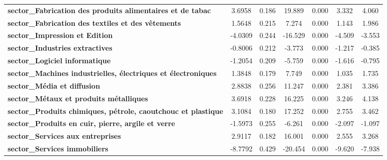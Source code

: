 \begin{center}
\begin{tabular}{lcccccc}
\textbf{sector\_Fabrication des produits alimentaires et de tabac}    &       3.6958  &        0.186     &    19.889  &         0.000        &        3.332    &        4.060     \\
\textbf{sector\_Fabrication des textiles et des vêtements}            &       1.5648  &        0.215     &     7.274  &         0.000        &        1.143    &        1.986     \\
\textbf{sector\_Impression et Edition}                                &      -4.0309  &        0.244     &   -16.529  &         0.000        &       -4.509    &       -3.553     \\
\textbf{sector\_Industries extractives}                               &      -0.8006  &        0.212     &    -3.773  &         0.000        &       -1.217    &       -0.385     \\
\textbf{sector\_Logiciel informatique}                                &      -1.2054  &        0.209     &    -5.759  &         0.000        &       -1.616    &       -0.795     \\
\textbf{sector\_Machines industrielles, électriques et électroniques} &       1.3848  &        0.179     &     7.749  &         0.000        &        1.035    &        1.735     \\
\textbf{sector\_Média et diffusion}                                   &       2.8838  &        0.256     &    11.247  &         0.000        &        2.381    &        3.386     \\
\textbf{sector\_Métaux et produits métalliques}                       &       3.6918  &        0.228     &    16.225  &         0.000        &        3.246    &        4.138     \\
\textbf{sector\_Produits chimiques, pétrole, caoutchouc et plastique} &       3.1084  &        0.180     &    17.252  &         0.000        &        2.755    &        3.462     \\
\textbf{sector\_Produits en cuir, pierre, argile et verre}            &      -1.5973  &        0.255     &    -6.261  &         0.000        &       -2.097    &       -1.097     \\
\textbf{sector\_Services aux entreprises}                             &       2.9117  &        0.182     &    16.001  &         0.000        &        2.555    &        3.268     \\
\textbf{sector\_Services immobiliers}                                 &      -8.7792  &        0.429     &   -20.454  &         0.000        &       -9.620    &       -7.938     \\

\end{tabular}
\end{center}
